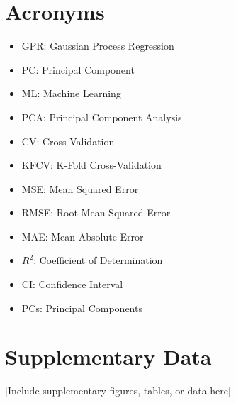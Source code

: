 \documentclass[12pt,letterpaper]{article}
\begin{document}
\section{Acronyms}
\begin{itemize}
    \item GPR: Gaussian Process Regression
    \item PC: Principal Component
    \item ML: Machine Learning
    \item PCA: Principal Component Analysis
    \item CV: Cross-Validation
    \item KFCV: K-Fold Cross-Validation
    \item MSE: Mean Squared Error
    \item RMSE: Root Mean Squared Error
    \item MAE: Mean Absolute Error
    \item $R^2$: Coefficient of Determination
    \item CI: Confidence Interval
    \item PCs: Principal Components
\end{itemize}

\newpage
\printbibliography[title=References]

\newpage
\appendix

\section{Supplementary Data}
\label{app:supplementary}

[Include supplementary figures, tables, or data here]
\end{document}
